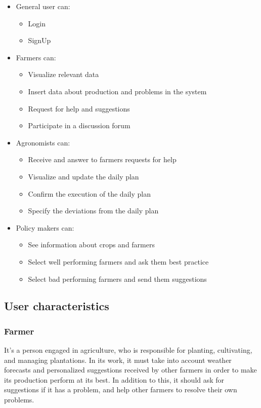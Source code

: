 \documentclass{article}
\begin{document}
    \begin{itemize}
        \item General user can:
            \begin{itemize}
                \item Login
                \item SignUp
            \end{itemize}
        \item Farmers can:
            \begin{itemize}
                \item Visualize relevant data
                \item Insert data about production and problems in the system
                \item Request for help and suggestions
                \item Participate in a discussion forum
            \end{itemize} 
        \item Agronomists can:
            \begin{itemize}
                \item Receive and answer to farmers requests for help
                \item Visualize and update the daily plan
                \item Confirm the execution of the daily plan
                \item Specify the deviations from the daily plan
            \end{itemize} 
        \item Policy makers can:
            \begin{itemize}
                \item See information about crops and farmers
                \item Select well performing farmers and ask them best practice
                \item Select bad performing farmers and send them suggestions
            \end{itemize}    
    \end{itemize}

\newpage

\subsection{User characteristics}

\subsubsection{Farmer}
    It’s a person engaged in agriculture, who is responsible for planting, cultivating, and managing plantations. In its work, it must take into account weather forecasts and personalized suggestions received by other farmers in order to make its production perform at its best. In addition to this, it should ask for suggestions if it has a problem, and help other farmers to resolve their own problems.
\end{document}
